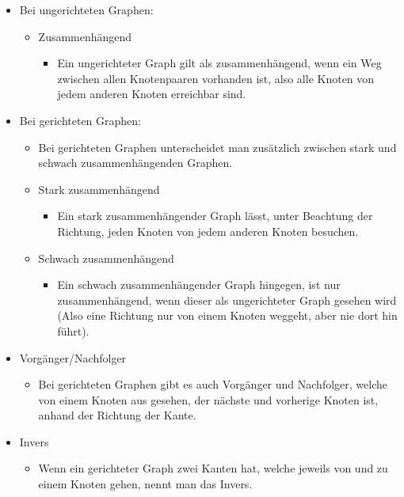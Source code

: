 \documentclass{article}
\begin{document}
	\begin{itemize}
		\item{Bei ungerichteten Graphen:}
		\begin{itemize}
			\item{Zusammenhängend}
			\begin{itemize}
				\item{Ein ungerichteter Graph gilt als zusammenhängend, wenn ein Weg zwischen allen Knotenpaaren vorhanden ist, also alle Knoten von jedem anderen Knoten erreichbar sind.}
			\end{itemize}
		\end{itemize}
		\item{Bei gerichteten Graphen:}
		\begin{itemize}
			\item{Bei gerichteten Graphen unterscheidet man zusätzlich zwischen stark und schwach zusammenhängenden Graphen.}
			\item{Stark zusammenhängend}
			\begin{itemize}
				\item{Ein stark zusammenhängender Graph lässt, unter Beachtung der Richtung, jeden Knoten von jedem anderen Knoten besuchen.}
			\end{itemize}
			\item{Schwach zusammenhängend}
			\begin{itemize}
				\item{Ein schwach zusammenhängender Graph hingegen, ist nur zusammenhängend, wenn dieser als ungerichteter Graph gesehen wird (Also eine Richtung nur von einem Knoten weggeht, aber nie dort hin führt).}
			\end{itemize}
		\end{itemize}
	\end{itemize}
	\begin{itemize}
		\item{Vorgänger/Nachfolger}
		\begin{itemize}
			\item{Bei gerichteten Graphen gibt es auch Vorgänger und Nachfolger, welche von einem Knoten aus gesehen, der nächste und vorherige Knoten ist, anhand der Richtung der Kante.}
		\end{itemize}
		\item{Invers}
		\begin{itemize}
			\item{Wenn ein gerichteter Graph zwei Kanten hat, welche jeweils von und zu einem Knoten gehen, nennt man das Invers.}
		\end{itemize}
	\end{itemize}
\end{document}

